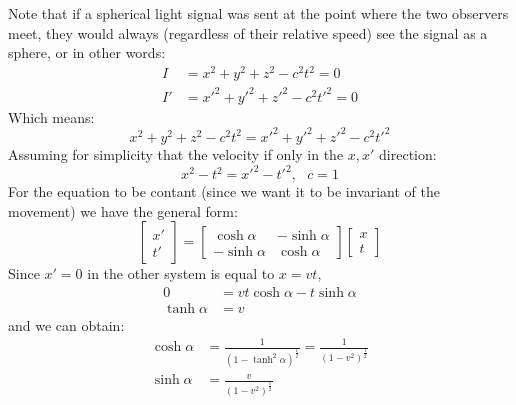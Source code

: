 \documentclass[10pt,a4paper,twocolumn]{article}
\begin{document}
                Note that if a spherical light signal was sent at the point where the two observers meet, they would always (regardless of their relative speed) see the signal as a sphere, or in other words:
                \begin{align*}
                    I &= x^2+y^2+z^2 - c^2t^2 = 0 \\
                    I'&= x'^2+y'^2+z'^2 - c^2t'^2 =0
                \end{align*}
                Which means:
                \begin{equation}
                    x^2+y^2+z^2 - c^2t^2 = x'^2+y'^2+z'^2 - c^2t'^2
                \end{equation}
                Assuming for simplicity that the velocity if only in the $x,x'$ direction:
                \begin{equation}
                    x^2-t^2 = x'^2-t'^2 , \ \ \ c =1
                \end{equation}
                For the equation to be contant (since we want it to be invariant of the movement) we have the general form:
                \begin{equation}
                    \begin{bmatrix}
                        x' \\ t' 
                    \end{bmatrix}  = \begin{bmatrix}
                            \cosh \alpha & - \sinh \alpha
                            \\ -\sinh\alpha & \cosh\alpha
                    \end{bmatrix}
                    \begin{bmatrix}
                        x\\ t\end{bmatrix}
                \end{equation}
                Since $x' = 0 $ in the other system is equal to $x = vt$,
                \begin{align*}
                    0 &= vt\cosh\alpha - t\sinh\alpha
                    \\
                    \tanh\alpha &= v
                \end{align*}
                and we can obtain:
                \begin{align}
                    \cosh\alpha &= \frac1{(1-\tanh^2\alpha)^{\frac12}} = \frac1{(1-v^2)^{\frac12}}\\
                    \sinh\alpha &= \frac{v}{(1-v^2)^{\frac12}}
                \end{align}
\end{document}
